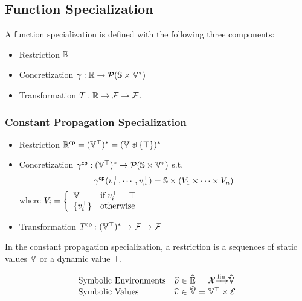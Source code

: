 \subsection{Function Specialization}

\todo

A function specialization is defined with the following three components:
\begin{itemize}
  \item Restriction $\mathbb{R}$
  \item Concretization $\gamma: \mathbb{R} \rightarrow \mathcal{P}(\mathbb{S}
    \times \mathbb{V}^*)$
  \item Transformation $T: \mathbb{R} \rightarrow \mathcal{F}
    \rightarrow \mathcal{F}$.
\end{itemize}

\todo



\subsubsection{Constant Propagation Specialization}
\begin{itemize}
  \item Restriction $\mathbb{R}^{\textsf{cp}} = (\mathbb{V}^\top)^* =
    (\mathbb{V} \uplus \{ \top \})^*$
  \item Concretization $\gamma^{\textsf{cp}}: (\mathbb{V}^\top)^* \rightarrow \mathcal{P}(\mathbb{S}
    \times \mathbb{V}^*)$ s.t.
    \[
      \gamma^{\textsf{cp}}(v^\top_1, \cdots, v^\top_n) = \mathbb{S} \times (V_1 \times \cdots
      \times V_n)
    \]
    where $V_i = \left\{
      \begin{array}{ll}
        \mathbb{V} & \text{if} \; v^\top_i = \top\\
        \{ v^\top_i \} & \text{otherwise}\\
      \end{array}
    \right.$
  \item Transformation $T^{\textsf{cp}}: (\mathbb{V}^\top)^* \rightarrow \mathcal{F}
    \rightarrow \mathcal{F}$
\end{itemize}
In the constant propagation specialization, a restriction is a sequences of
static values $\mathbb{V}$ or a dynamic value $\top$.

\[
  \begin{array}{lr@{~}c@{~}l@{~}c@{~}l}
    \text{Symbolic Environments} & \senv &\in& \senvset &=&
    \varset \finmap \svalset\\
    \text{Symbolic Values} & \sval &\in& \svalset &=&
    \valoptset \times \exprset\\
  \end{array}
\]

